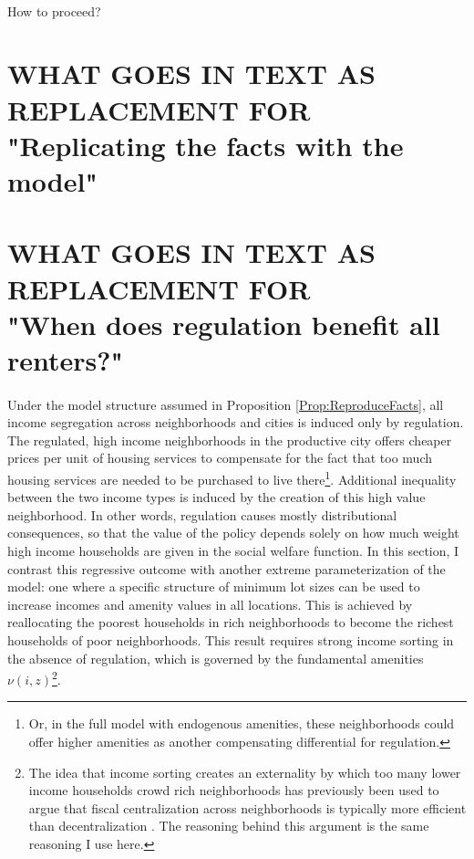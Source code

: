 \documentclass[11pt]{article}
\begin{document}
\paragraph*{}
How to proceed? 
	
	
	
	
	
	\newpage

\section{WHAT GOES IN TEXT AS REPLACEMENT FOR \\ "Replicating the facts with the model"}



\section{WHAT GOES IN TEXT AS REPLACEMENT FOR \\ "When does regulation benefit all renters?"}
	
	\paragraph*{}
	Under the model structure assumed in Proposition \ref{Prop:ReproduceFacts}, all income segregation across neighborhoods and cities is induced only by regulation. The regulated, high income neighborhoods in the productive city offers cheaper prices per unit of housing services to compensate for the fact that too much housing services are needed to be purchased to live there\footnote{Or, in the full model with endogenous amenities, these neighborhoods could offer higher amenities as another compensating differential for regulation.}. Additional inequality between the two income types is induced by the creation of this high value neighborhood. In other words, regulation causes mostly distributional consequences, so that the value of the policy depends solely on how much weight high income households are given in the social welfare function. In this section, I contrast this regressive outcome with another extreme parameterization of the model: one where a specific structure of minimum lot sizes can be used to increase incomes and amenity values in all locations. This is achieved by reallocating the poorest households in rich neighborhoods to become the richest households of poor neighborhoods. This result requires strong income sorting in the absence of regulation, which is governed by the fundamental amenities $\nu(i, z)$\footnote{The idea that income sorting creates an externality by which too many lower income households crowd rich neighborhoods has previously been used to argue that fiscal centralization across neighborhoods is typically more efficient than decentralization \citep{ineffTiebout}. The reasoning behind this argument is the same reasoning I use here.}. 
	
\end{document}
